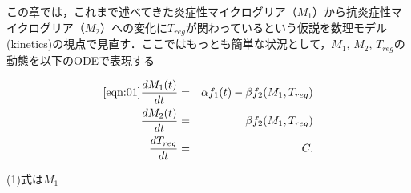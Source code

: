 \documentclass{jsarticle}
\begin{document}
この章では，これまで述べてきた炎症性マイクログリア（$M_1$）から抗炎症性マイクログリア（$M_2$）への変化に$T_{reg}$が関わっているという仮説を数理モデル(kinetics)の視点で見直す．ここではもっとも簡単な状況として，$M_1$, $M_2$, $T_{reg}$の動態を以下のODEで表現する

\begin{eqnarray}
  \ref{eqn:01}
  \frac{dM_{1}(t)}{dt} &=& \alpha f_1(t)- \beta f_2(M_1, T_{reg}) \\
  \frac{dM_2(t)}{dt} &=& \beta f_2(M_1, T_{reg}) \\
  \frac{dT_{reg}}{dt} &=& C .
\end{eqnarray}

(1)式は$M_1$
\end{document}
